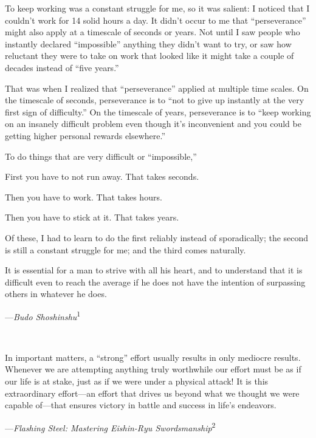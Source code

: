 {
 To keep working was a constant struggle for me, so it was salient:
I noticed that I couldn't work for 14 solid hours a
day. It didn't occur to me that
``perseverance'' might also apply at
a timescale of seconds or years. Not until I saw people who instantly
declared ``impossible'' anything
they didn't want to try, or saw how reluctant they were
to take on work that looked like it might take a couple of decades
instead of ``five years.''}

{
 That was when I realized that
``perseverance'' applied at multiple
time scales. On the timescale of seconds, perseverance is to
``not to give up instantly at the very first sign of
difficulty.'' On the timescale of years, perseverance
is to ``keep working on an insanely difficult problem
even though it's inconvenient and you could be getting
higher personal rewards elsewhere.''}

{
 To do things that are very difficult or
``impossible,''}

{
 First you have to not run away. That takes seconds.}

{
 Then you have to work. That takes hours.}

{
 Then you have to stick at it. That takes years.}

{
 Of these, I had to learn to do the first reliably instead of
sporadically; the second is still a constant struggle for me; and the
third comes naturally.}

\myendsectiontext


{
 It is essential for a man to strive with all his heart, and to
understand that it is difficult even to reach the average if he does
not have the intention of surpassing others in whatever he does.}

{\raggedleft
 {}---\textit{Budo Shoshinshu}\textsuperscript{1}
\par}


\bigskip

{
 ~}

{
 In important matters, a
``strong'' effort usually results in
only mediocre results. Whenever we are attempting anything truly
worthwhile our effort must be as if our life is at stake, just as if we
were under a physical attack! It is this extraordinary effort---an
effort that drives us beyond what we thought we were capable of---that
ensures victory in battle and success in life's
endeavors.}

{\raggedleft
 {}---\textit{Flashing Steel: Mastering Eishin-Ryu
Swordsmanship}\textsuperscript{2}
\par}


